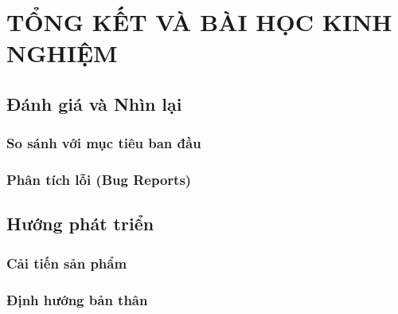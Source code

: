 \part{TỔNG KẾT VÀ BÀI HỌC KINH NGHIỆM}

\chapter{Đánh giá và Nhìn lại}
\section{So sánh với mục tiêu ban đầu}
\section{Phân tích lỗi (Bug Reports)}

\chapter{Hướng phát triển}
\section{Cải tiến sản phẩm}
\section{Định hướng bản thân}
